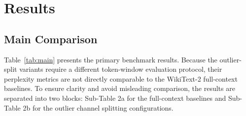 
\section{Results}
\label{sec:results}

\subsection{Main Comparison}
\label{sec:results:main}

Table~\ref{tab:main} presents the primary benchmark results. Because the outlier-split variants require a different token-window evaluation protocol, their perplexity metrics are not directly comparable to the WikiText-2 full-context baselines. To ensure clarity and avoid misleading comparison, the results are separated into two blocks: Sub-Table 2a for the full-context baselines and Sub-Table 2b for the outlier channel splitting configurations.

